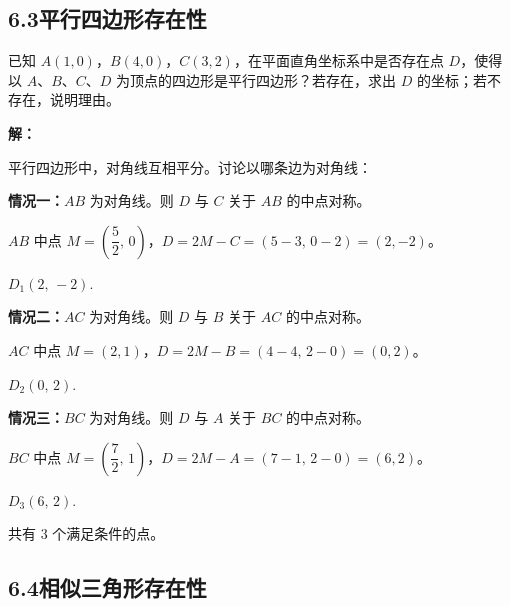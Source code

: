 \documentclass[12pt, a4paper]{ctexart}
\begin{document}
\subsection*{6.3\quad 平行四边形存在性}

\begin{examplebox}[【例17】平行四边形存在性]
已知 $A(1,0)$，$B(4,0)$，$C(3,2)$，在平面直角坐标系中是否存在点 $D$，使得以 $A$、$B$、$C$、$D$ 为顶点的四边形是平行四边形？若存在，求出 $D$ 的坐标；若不存在，说明理由。

\textbf{解：}

平行四边形中，对角线互相平分。讨论以哪条边为对角线：

\textbf{情况一：}$AB$ 为对角线。则 $D$ 与 $C$ 关于 $AB$ 的中点对称。

$AB$ 中点 $M=\left(\dfrac{5}{2},\,0\right)$，$D=2M-C=(5-3,\,0-2)=(2,-2)$。

$\boxed{D_1(2,\,-2).}$

\textbf{情况二：}$AC$ 为对角线。则 $D$ 与 $B$ 关于 $AC$ 的中点对称。

$AC$ 中点 $M=(2,1)$，$D=2M-B=(4-4,\,2-0)=(0,2)$。

$\boxed{D_2(0,\,2).}$

\textbf{情况三：}$BC$ 为对角线。则 $D$ 与 $A$ 关于 $BC$ 的中点对称。

$BC$ 中点 $M=\left(\dfrac{7}{2},\,1\right)$，$D=2M-A=(7-1,\,2-0)=(6,2)$。

$\boxed{D_3(6,\,2).}$

共有 $\boxed{3}$ 个满足条件的点。
\end{examplebox}

\subsection*{6.4\quad 相似三角形存在性}
\end{document}

